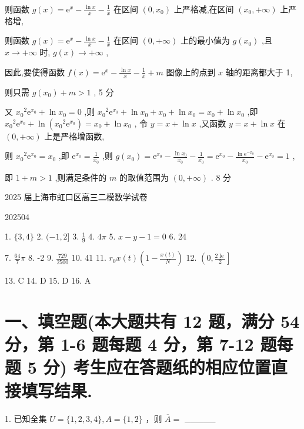 \documentclass[10pt]{article}
\begin{document}
则函数 \(g\left( x\right)  = {\mathrm{e}}^{x} - \frac{\ln x}{x} - \frac{1}{x}\) 在区间 \(\left( {0,{x}_{0}}\right)\) 上严格减,在区间 \(\left( {{x}_{0}, + \infty }\right)\) 上严格增,

则函数 \(g\left( x\right)  = {\mathrm{e}}^{x} - \frac{\ln x}{x} - \frac{1}{x}\) 在区间 \(\left( {0, + \infty }\right)\) 上的最小值为 \(g\left( {x}_{0}\right)\) ,且 \(x \rightarrow   + \infty\) 时, \(g\left( x\right)  \rightarrow   + \infty\) ,

因此,要使得函数 \(f\left( x\right)  = {\mathrm{e}}^{x} - \frac{\ln x}{x} - \frac{1}{x} + m\) 图像上的点到 \(x\) 轴的距离都大于 1,

则只需 \(g\left( {x}_{0}\right)  + m > 1\) , 5 分

又 \({x}_{0}{}^{2}{\mathrm{e}}^{{x}_{0}} + \ln {x}_{0} = 0\) ,则 \({x}_{0}{}^{2}{\mathrm{e}}^{{x}_{0}} + \ln {x}_{0} + {x}_{0} + \ln {x}_{0} = {x}_{0} + \ln {x}_{0}\) ,即 \({x}_{0}{}^{2}{\mathrm{e}}^{{x}_{0}} + \ln \left( {{x}_{0}{}^{2}{\mathrm{e}}^{{x}_{0}}}\right)  = {x}_{0} + \ln {x}_{0}\) , 令 \(y = x + \ln x\) ,又函数 \(y = x + \ln x\) 在 \(\left( {0, + \infty }\right)\) 上是严格增函数,

则 \({x}_{0}{}^{2}{\mathrm{e}}^{{x}_{0}} = {x}_{0}\) ,即 \({\mathrm{e}}^{{x}_{0}} = \frac{1}{{x}_{0}}\) ,则 \(g\left( {x}_{0}\right)  = {\mathrm{e}}^{{x}_{0}} - \frac{\ln {x}_{0}}{{x}_{0}} - \frac{1}{{x}_{0}} = {\mathrm{e}}^{{x}_{0}} - \frac{\ln {\mathrm{e}}^{-{x}_{0}}}{{x}_{0}} - {\mathrm{e}}^{{x}_{0}} = 1\) ,

即 \(1 + m > 1\) ,则满足条件的 \(m\) 的取值范围为 \(\left( {0, + \infty }\right)\) . 8 分

2025 届上海市虹口区高三二模数学试卷

202504

1. \(\{ 3,4\}\) 2. \(( - 1,2\rbrack\) 3. \(\frac{1}{9}\) 4. \({4\pi }\) 5. \(x - y - 1 = 0\) 6. 24

7. \(\frac{64}{7}\pi\) 8. -2 9. \(\frac{729}{2500}\) 10. 41 11. \({r}_{0}x\left( t\right) \left( {1 - \frac{x\left( t\right) }{N}}\right)\) 12. \(\left( {0,\frac{2\operatorname{le}}{2}}\right\rbrack\)

13. C 14. D 15. D 16. A

\section*{一、填空题(本大题共有 12 题，满分 54 分，第 1-6 题每题 4 分，第 7-12 题每题 5 分) 考生应在答题纸的相应位置直接填写结果.}

1. 已知全集 \(U = \{ 1,2,3,4\} ,A = \{ 1,2\}\) ，则 \(\overline{A} =\) \_\_\_\_\_
\end{document}
